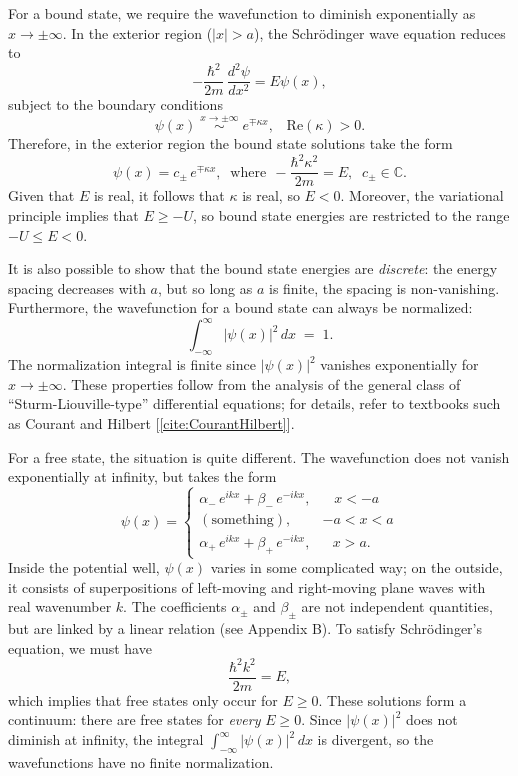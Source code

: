 \documentclass[pra,12pt]{revtex4}
\begin{document}
For a bound state, we require the wavefunction to diminish
exponentially as $x \rightarrow \pm\infty$.  In the exterior region
($|x| > a$), the Schr\"odinger wave equation reduces to
\begin{equation}
  -\frac{\hbar^2}{2m}\,\frac{d^2\psi}{dx^2} = E \psi(x),
\end{equation}
subject to the boundary conditions
\begin{equation}
  \psi(x) \;\overset{x\rightarrow\pm\infty}{\sim} \; e^{\mp\kappa x}, \;\;\;\mathrm{Re}(\kappa) > 0.
\end{equation}
Therefore, in the exterior region the bound state solutions take the
form
\begin{equation}
  \psi(x) = c_\pm\, e^{\mp\kappa x}, \;\;\mathrm{where}\;\, -\frac{\hbar^2\kappa^2}{2m} = E, \;\; c_\pm \in \mathbb{C}.
\end{equation}
Given that $E$ is real, it follows that $\kappa$ is real, so $E < 0$.
Moreover, the variational principle implies that $E \ge -U$, so bound
state energies are restricted to the range $-U \le E < 0$.

It is also possible to show that the bound state energies are
\textit{discrete}: the energy spacing decreases with $a$, but so long
as $a$ is finite, the spacing is non-vanishing.  Furthermore, the
wavefunction for a bound state can always be normalized:
\begin{equation}
  \int_{-\infty}^\infty |\psi(x)|^2\, dx\; =\; 1.
\end{equation}
The normalization integral is finite since $|\psi(x)|^2$ vanishes
exponentially for $x \rightarrow \pm \infty$.  These properties follow
from the analysis of the general class of ``Sturm-Liouville-type''
differential equations; for details, refer to textbooks such as
Courant and Hilbert [\ref{cite:CourantHilbert}].

For a free state, the situation is quite different.  The wavefunction
does not vanish exponentially at infinity, but takes the form
\begin{equation}
  \psi(x) = \begin{cases} \alpha_-\, e^{ik x} + \beta_-\, e^{-ik x}, & \;\;\;x < -a\\ (\mathrm{something}) , & -a < x < a\\ \alpha_+\, e^{ik x} + \beta_+\, e^{-ik x} , & \;\;\,x > a.\end{cases}
\end{equation}
Inside the potential well, $\psi(x)$ varies in some complicated way;
on the outside, it consists of superpositions of left-moving and
right-moving plane waves with real wavenumber $k$.  The coefficients
$\alpha_\pm$ and $\beta_\pm$ are not independent quantities, but are
linked by a linear relation (see Appendix B).  To satisfy
Schr\"odinger's equation, we must have
\begin{equation}
  \frac{\hbar^2k^2}{2m} = E,
\end{equation}
which implies that free states only occur for $E \ge 0$.  These
solutions form a continuum: there are free states for \textit{every}
$E \ge 0$.  Since $|\psi(x)|^2$ does not diminish at infinity, the
integral $\int_{-\infty}^\infty |\psi(x)|^2\, dx$ is divergent, so the
wavefunctions have no finite normalization.
\end{document}
